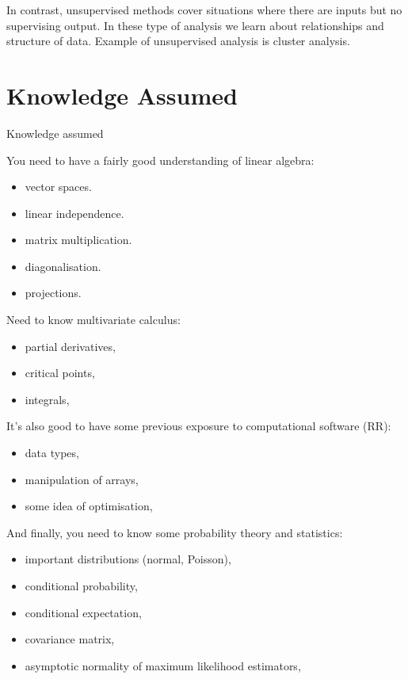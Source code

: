 \documentclass[11pt]{article}
\begin{document}
In contrast, unsupervised methods cover situations where there are inputs but no supervising output.
In these type of analysis we learn about relationships and structure of data.
Example of unsupervised analysis is cluster analysis.
\blindtext

\section{Knowledge Assumed}\label{sec:Knowledge-Assumed}
Knowledge assumed

You need to have a fairly good understanding of linear algebra:
\begin{itemize}
\item vector spaces.
\item linear independence.
\item matrix multiplication.
\item diagonalisation.
\item projections.
\end{itemize}

Need to know multivariate calculus:
\begin{itemize}
\item partial derivatives,
\item critical points,
\item integrals,
\end{itemize}

It's also good to have some previous exposure to computational software (RR):
\begin{itemize}
\item data types,
\item manipulation of arrays,
\item some idea of optimisation,
\end{itemize}

And finally, you need to know some probability theory and statistics:
\begin{itemize}
\item important distributions (normal, Poisson),
\item conditional probability,
\item conditional expectation,
\item covariance matrix,
\item asymptotic normality of maximum likelihood estimators,
\end{itemize}
\blindtext
\end{document}
